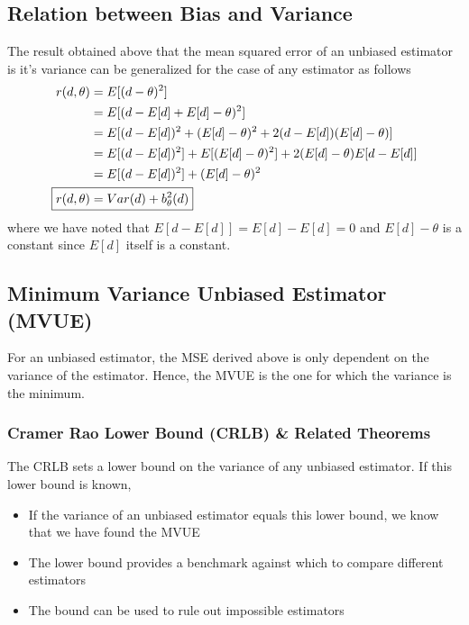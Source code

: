 \documentclass[../probability-notes.tex]{subfiles}
\begin{document}
    \subsection{Relation between Bias and Variance}
    The result obtained above that the mean squared error of an unbiased estimator is it's variance can be generalized for the case of any estimator as follows
    \begin{align*}
        r(d, \theta) &= E[(d - \theta)^{2}]\\
        &= E[(d - E[d] + E[d] -\theta)^{2}]\\
        &= E[(d - E[d])^{2} + (E[d] - \theta)^{2} + 2(d - E[d])(E[d] - \theta)]\\
        &= E[(d - E[d])^{2}] + E[(E[d] - \theta)^{2}] + 2(E[d] - \theta)E[d - E[d]]\\
        &= E[(d - E[d])^{2}] + (E[d] - \theta)^{2}\\
        \Aboxed{r(d, \theta) &= Var(d) + b_{\theta}^{2}(d)}\\
    \end{align*}
    where we have noted that $E[d - E[d]] = E[d] - E[d] = 0$ and $E[d] - \theta$ is a constant since $E[d]$ itself is a constant.

    \subsection{Minimum Variance Unbiased Estimator (MVUE)}
    For an unbiased estimator, the MSE derived above is only dependent on the variance of the estimator. Hence, the MVUE is the one for which the variance is the minimum.

    \subsubsection{Cramer Rao Lower Bound (CRLB) \& Related Theorems}
    The CRLB sets a lower bound on the variance of any unbiased estimator. If this lower bound is known,
    \begin{itemize}
        \item If the variance of an unbiased estimator equals this lower bound, we know that we have found the MVUE
        \item The lower bound provides a benchmark against which to compare different estimators
        \item The bound can be used to rule out impossible estimators
    \end{itemize}
\end{document}
